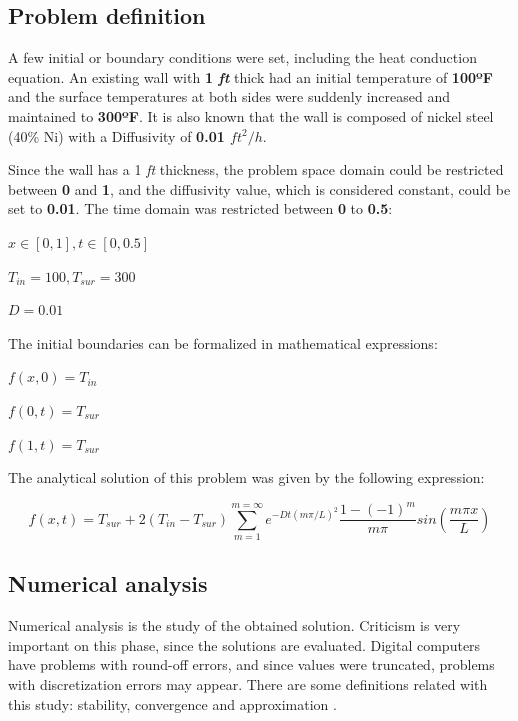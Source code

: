 \documentclass[12pt]{article}
\begin{document}
\subsection*{Problem definition}
A few initial or boundary conditions were set, including the heat conduction equation. An existing wall with \textbf{1 \textit{ft}} thick had an initial temperature of \textbf{100ºF} and the surface temperatures at both sides were suddenly increased and maintained to \textbf{300ºF}. It is also known that the wall is composed of nickel steel (40\% Ni) with a Diffusivity of \textbf{0.01 $ft ^2/h$}.
\par
Since the wall has a 1 \textit{ft} thickness, the problem space domain could be restricted between \textbf{0} and \textbf{1}, and the diffusivity value, which is considered constant, could be set to \textbf{0.01}. The time domain was restricted between \textbf{0} to \textbf{0.5}:
\begin{center}
\normalsize
$
x \in [0, 1], t \in [0, 0.5]
$
\end{center}
\begin{center}
\normalsize
$
T_{in} = 100, T_{sur} = 300
$
\end{center}
\begin{center}
\normalsize
$
D = 0.01
$
\end{center}
\par 
The initial boundaries can be formalized in mathematical expressions:
\begin{center}
\normalsize
$
f(x,0) = T_{in}
$
\end{center}
\begin{center}
\normalsize
$
f(0,t) = T_{sur}
$
\end{center}
\begin{center}
\normalsize
$
f(1,t) = T_{sur}
$
\end{center}
\par
The analytical solution of this problem was given by the following expression:
\begin{center}
\normalsize
$$
f(x,t) = T_{sur} + 2(T_{in} - T_{sur}) \sum_{m=1}^{m=\infty} 
e ^{-D t (m \pi / L) ^2}  \frac{1 - (-1)^m}{m \pi} sin \left(\frac{m \pi x}{L}\right)$$  

\end{center}

\subsection*{Numerical analysis}
\par Numerical analysis is the study of the obtained solution. Criticism is very important on this phase, since the solutions are evaluated. Digital computers have problems with round-off errors, and since values were truncated, problems with discretization errors may appear. There are some definitions related with this study: stability, convergence and approximation \cite{convergence_stability_consistency, numerical_analysis}.
\end{document}
